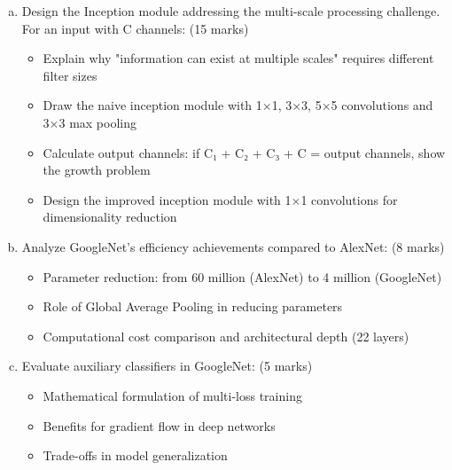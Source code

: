 \documentclass[12pt]{article}
\newcommand{\shortanswer}{\vspace{2cm}}
\newcommand{\mediumanswer}{\vspace{3cm}}
\begin{document}
\begin{enumerate}[(a)]
    \item Design the Inception module addressing the multi-scale processing challenge. For an input with C channels: \hfill (15 marks)
    \begin{itemize}
        \item Explain why "information can exist at multiple scales" requires different filter sizes
        \item Draw the naive inception module with 1×1, 3×3, 5×5 convolutions and 3×3 max pooling
        \item Calculate output channels: if C₁ + C₂ + C₃ + C = output channels, show the growth problem
        \item Design the improved inception module with 1×1 convolutions for dimensionality reduction
    \end{itemize}
    
    \begin{center}
    \end{center}
    
    \shortanswer
    
    \item Analyze GoogleNet's efficiency achievements compared to AlexNet: \hfill (8 marks)
    \begin{itemize}
        \item Parameter reduction: from 60 million (AlexNet) to 4 million (GoogleNet)
        \item Role of Global Average Pooling in reducing parameters
        \item Computational cost comparison and architectural depth (22 layers)
    \end{itemize}
    
    \mediumanswer
    
    \item Evaluate auxiliary classifiers in GoogleNet: \hfill (5 marks)
    \begin{itemize}
        \item Mathematical formulation of multi-loss training
        \item Benefits for gradient flow in deep networks
        \item Trade-offs in model generalization
    \end{itemize}
    
    \shortanswer
\end{enumerate}
\end{document}
